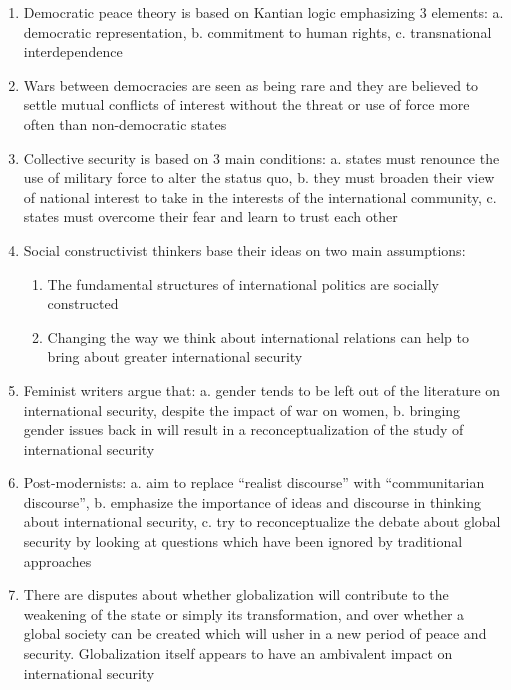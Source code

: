 \documentclass[12pt]{article}
\begin{document}
\begin{enumerate}
\begin{enumerate}
\begin{enumerate}
              \item Democratic peace theory is based on Kantian logic emphasizing 3 elements: a. democratic representation, b. commitment to human rights, c. transnational interdependence

              \item Wars between democracies are seen as being rare and they are believed to settle mutual conflicts of interest without the threat or use of force more often than non-democratic states

              \item Collective security is based on 3 main conditions: a. states must renounce the use of military force to alter the status quo,  b. they must broaden their view of national interest to take in the interests of the international community,  c. states must overcome their fear and learn to trust each other

              \item Social constructivist thinkers base their ideas on two main assumptions:

                \begin{enumerate}

                  \item The fundamental structures of international politics are socially constructed

                  \item Changing the way we think about international relations can help to bring about greater international security

                \end{enumerate}

              \item Feminist writers argue that: a. gender tends to be left out of the literature on international security, despite the impact of war on women, b. bringing gender issues back in will result in a reconceptualization of the study of international security

              \item Post-modernists: a. aim to replace “realist discourse” with “communitarian discourse”, b. emphasize the importance of ideas and discourse in thinking about international security, c. try to reconceptualize the debate about global security by looking at questions which have been ignored by traditional approaches

              \item There are disputes about whether globalization will contribute to the weakening of the state or simply its transformation, and over whether a global society can be created which will usher in a new period of peace and security. Globalization itself appears to have an ambivalent impact on international security


\end{enumerate}
\end{enumerate}
\end{enumerate}
\end{document}

